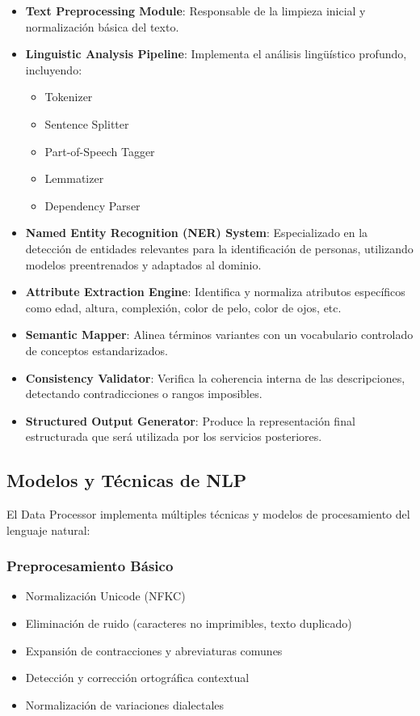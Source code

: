 \documentclass[12pt,a4paper]{article}
\begin{document}
\begin{itemize}
    \item \textbf{Text Preprocessing Module}: Responsable de la limpieza inicial y normalización básica del texto.
    
    \item \textbf{Linguistic Analysis Pipeline}: Implementa el análisis lingüístico profundo, incluyendo:
    \begin{itemize}
        \item Tokenizer
        \item Sentence Splitter
        \item Part-of-Speech Tagger
        \item Lemmatizer
        \item Dependency Parser
    \end{itemize}
    
    \item \textbf{Named Entity Recognition (NER) System}: Especializado en la detección de entidades relevantes para la identificación de personas, utilizando modelos preentrenados y adaptados al dominio.
    
    \item \textbf{Attribute Extraction Engine}: Identifica y normaliza atributos específicos como edad, altura, complexión, color de pelo, color de ojos, etc.
    
    \item \textbf{Semantic Mapper}: Alinea términos variantes con un vocabulario controlado de conceptos estandarizados.
    
    \item \textbf{Consistency Validator}: Verifica la coherencia interna de las descripciones, detectando contradicciones o rangos imposibles.
    
    \item \textbf{Structured Output Generator}: Produce la representación final estructurada que será utilizada por los servicios posteriores.
\end{itemize}

\subsection{Modelos y Técnicas de NLP}
\label{subsec:dp-modelos}

El Data Processor implementa múltiples técnicas y modelos de procesamiento del lenguaje natural:

\subsubsection{Preprocesamiento Básico}
\begin{itemize}
    \item Normalización Unicode (NFKC)
    \item Eliminación de ruido (caracteres no imprimibles, texto duplicado)
    \item Expansión de contracciones y abreviaturas comunes
    \item Detección y corrección ortográfica contextual
    \item Normalización de variaciones dialectales
\end{itemize}
\end{document}
